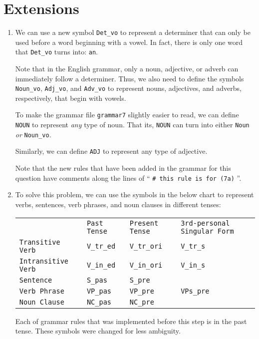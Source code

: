 \documentclass[11pt]{article}
\newcommand{\code}[1]{\texttt{#1}}
\begin{document}
\section{Extensions}
\begin{enumerate}
\item
	We can use a new symbol \code{Det\_vo} to represent a determiner that can only be used before a word beginning with a vowel. In fact, there is only one word that \code{Det\_vo} turns into: \code{an}.
	
Note that in the English grammar, only a noun, adjective, or adverb can immediately follow a determiner.
Thus, we also need to define the symbols \code{Noun\_vo}, \code{Adj\_vo}, and \code{Adv\_vo} to represent nouns, adjectives, and adverbs, respectively, that begin with vowels.

To make the grammar file \code{grammar7} slightly easier to read, we can define \code{NOUN} to represent \textit{any} type of noun. That its, \code{NOUN} can turn into either \code{Noun} \textit{or} \code{Noun\_vo}.

Similarly, we can define \code{ADJ} to represent any type of adjective. 

Note that the new rules that have been added in the grammar for this question have comments along the lines of `` \code{\# this rule is for (7a)} ''.
\item
	To solve this problem, we can use the symbols in the below chart to represent verbs, sentences, verb phrases, and noun clauses in different tenses:
\begin{center} \begin{tabular}{l l l l}
    &                              \code{Past Tense} & \code{Present Tense} & \code{3rd-personal Singular Form}  \\
\code{Transitive Verb}   & \code{V\_tr\_ed} & \code{V\_tr\_ori}  & \code{V\_tr\_s} \\
\code{Intransitive Verb} & \code{V\_in\_ed} & \code{V\_in\_ori} & \code{V\_in\_s} \\
\code{Sentence}            & \code{S\_pas}     & \code{S\_pre}      &     \\
\code{Verb Phrase}       & \code{VP\_pas}   & \code{VP\_pre}   & \code{VPs\_pre} \\
\code{Noun Clause}      & \code{NC\_pas}   & \code{NC\_pre}  &                            \\
\end{tabular}\end{center}
	Each of grammar rules that was implemented before this step is in the past tense. These symbols were changed for less ambiguity.
	

\end{enumerate}
\end{document}
